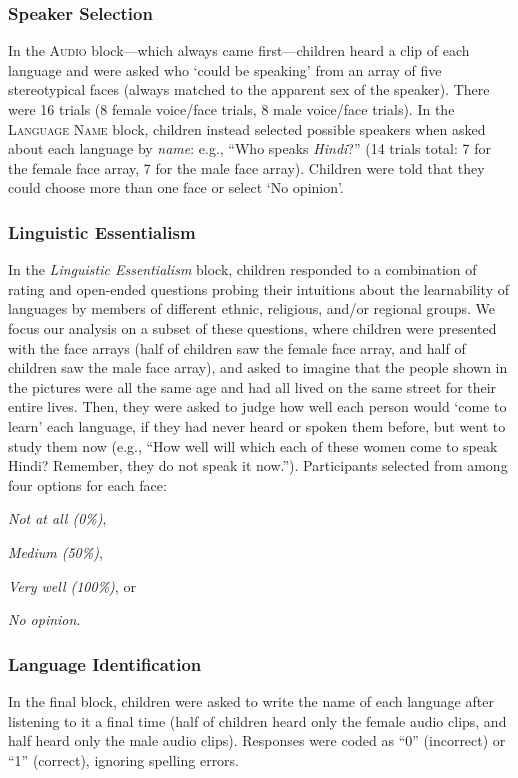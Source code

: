 \documentclass{foushee-adapted-preprint}
\begin{document}
\subsubsection*{Speaker Selection}
In the \textsc{Audio} block---which always came first---children heard a clip of each language and were asked who `could be speaking' from an array of five stereotypical faces (always matched to the apparent sex of the speaker). There were 16 trials (8 female voice/face trials, 8 male voice/face trials). In the \textsc{Language Name} block, children instead selected possible speakers when asked about each language by \textit{name}: e.g., ``Who speaks \textit{Hindi}?'' (14 trials total: 7 for the female face array, 7 for the male face array). Children were told that they could choose more than one face or select `No opinion'. 

\subsubsection*{Linguistic Essentialism} 
In the \textit{Linguistic Essentialism} block, children responded to a combination of rating and open-ended questions probing their intuitions about the learnability of languages by members of different ethnic, religious, and/or regional groups. We focus our analysis on a subset of these questions, where children were presented with the face arrays (half of children saw the female face array, and half of children saw the male face array), and asked to imagine that the people shown in the pictures were all the same age and had all lived on the same street for their entire lives. Then, they were asked to judge how well each person would `come to learn' each language, if they had never heard or spoken them before, but went to study them now (e.g., ``How well will which each of these women come to speak Hindi? Remember, they do not speak it now.''). 
Participants selected from among four options for each face:
\begin{inparaenum}[(a)]
    \item \textit{Not at all (0\%)},
    \item \textit{Medium (50\%)},
    \item \textit{Very well (100\%)}, or 
    \item \textit{No opinion}. 
\end{inparaenum}

\subsubsection*{Language Identification}
In the final block, children were asked to write the name of each language after listening to it a final time (half of children heard only the female audio clips, and half heard only the male audio clips). Responses were coded as ``0'' (incorrect) or ``1'' (correct), ignoring spelling errors.
\end{document}
